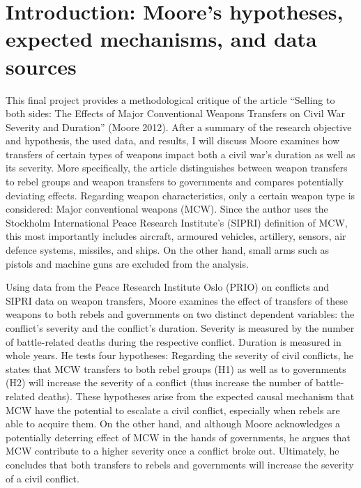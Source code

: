 \documentclass[
]{article}
\begin{document}
\hypertarget{introduction-moores-hypotheses-expected-mechanisms-and-data-sources}{%
\section{Introduction: Moore's hypotheses, expected mechanisms, and data
sources}\label{introduction-moores-hypotheses-expected-mechanisms-and-data-sources}}

This final project provides a methodological critique of the article
``Selling to both sides: The Effects of Major Conventional Weapons
Transfers on Civil War Severity and Duration'' (Moore 2012). After a
summary of the research objective and hypothesis, the used data, and
results, I will discuss Moore examines how transfers of certain types of
weapons impact both a civil war's duration as well as its severity. More
specifically, the article distinguishes between weapon transfers to
rebel groups and weapon transfers to governments and compares
potentially deviating effects. Regarding weapon characteristics, only a
certain weapon type is considered: Major conventional weapons (MCW).
Since the author uses the Stockholm International Peace Research
Institute's (SIPRI) definition of MCW, this most importantly includes
aircraft, armoured vehicles, artillery, sensors, air defence systems,
missiles, and ships. On the other hand, small arms such as pistols and
machine guns are excluded from the analysis.

Using data from the Peace Research Institute Oslo (PRIO) on conflicts
and SIPRI data on weapon transfers, Moore examines the effect of
transfers of these weapons to both rebels and governments on two
distinct dependent variables: the conflict's severity and the conflict's
duration. Severity is measured by the number of battle-related deaths
during the respective conflict. Duration is measured in whole years. He
tests four hypotheses: Regarding the severity of civil conflicts, he
states that MCW transfers to both rebel groups (H1) as well as to
governments (H2) will increase the severity of a conflict (thus increase
the number of battle-related deaths). These hypotheses arise from the
expected causal mechanism that MCW have the potential to escalate a
civil conflict, especially when rebels are able to acquire them. On the
other hand, and although Moore acknowledges a potentially deterring
effect of MCW in the hands of governments, he argues that MCW contribute
to a higher severity once a conflict broke out. Ultimately, he concludes
that both transfers to rebels and governments will increase the severity
of a civil conflict.
\end{document}
